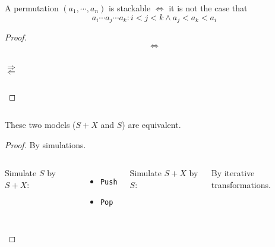 \begin{frame}{}
  \begin{theorem}
    A permutation $(a_1, \cdots, a_n)$ is stackable $\iff$ it is not the case that
    \[
      a_i \cdots a_j \cdots a_k: i < j < k \land a_j < a_k < a_i
    \]
  \end{theorem}

  \pause
  \begin{proof}
    \[
      \iff
    \]
    \pause
    \begin{columns}
        \[
	  \Rightarrow
	\]
        \[
	  \Leftarrow
	\]
    \end{columns}
  \end{proof}
\end{frame}

\begin{frame}{}
  \begin{columns}
  \end{columns}

  \begin{theorem}[Equivalence]
    These two models ($S + X$ and $S$) are equivalent.
  \end{theorem}

  \pause
  \begin{proof}
    \centerline{\Large By simulations.}
    \vspace{0.20cm}
    \begin{columns}[t]
        Simulate $S$ by $S + X$:
	\begin{itemize}
	  \item \texttt{Push}
	  \item \texttt{Pop}
	\end{itemize}
        Simulate $S + X$ by $S$:
	\centerline{\large By iterative transformations.}
    \end{columns}
  \end{proof}
\end{frame}

